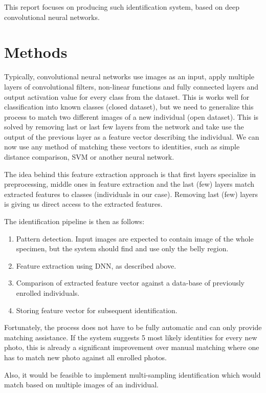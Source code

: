 \documentclass[fleqn,moreauthors,10pt]{ds_report}
\begin{document}
This report focuses on producing such identification system, based on deep convolutional neural networks.

\section*{Methods}

Typically, convolutional neural networks use images as an input, apply multiple layers of convolutional filters, non-linear functions and fully connected layers and output activation value for every class from the dataset. This is works well for classification into known classes (closed dataset), but we need to generalize this process to match two different images of a new individual (open dataset). This is solved by removing last or last few layers from the network and take use the output of the previous layer as a feature vector describing the individual. We can now use any method of matching these vectors to identities, such as simple distance comparison, SVM or another neural network.

The idea behind this feature extraction approach is that first layers specialize in preprocessing, middle ones in feature extraction and the last (few) layers match extracted features to classes (individuals in our case). Removing last (few) layers is giving us direct access to the extracted features.

The identification pipeline is then as follows:
\begin{enumerate}
	\itemsep0em 
	\item Pattern detection. Input images are expected to contain image of the whole specimen, but the system should find and use only the belly region.
	\item Feature extraction using DNN, as described above.
	\item Comparison of extracted feature vector against a data-base of previously enrolled individuals.
	\item Storing feature vector for subsequent identification.
\end{enumerate}

Fortunately, the process does not have to be fully automatic and can only provide matching assistance. If the system suggests 5 most likely identities for every new photo, this is already a significant improvement over manual matching where one has to match new photo against all enrolled photos.

Also, it would be feasible to implement multi-sampling identification which would match based on multiple images of an individual.
\end{document}
